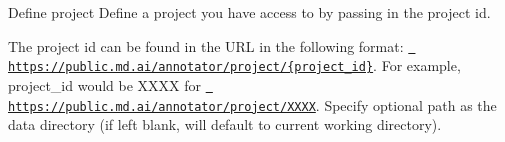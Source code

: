Define project Define a project you have access to by passing in the project id.

The project id can be found in the URL in the following format\+: {\ttfamily \href{https://public.md.ai/annotator/project/{project_id}}{\texttt{ https\+://public.\+md.\+ai/annotator/project/\{project\+\_\+id\}}}}. For example, {\ttfamily project\+\_\+id} would be {\ttfamily XXXX} for {\ttfamily \href{https://public.md.ai/annotator/project/XXXX}{\texttt{ https\+://public.\+md.\+ai/annotator/project/\+XXXX}}}. Specify optional {\ttfamily path} as the data directory (if left blank, will default to current working directory). 
